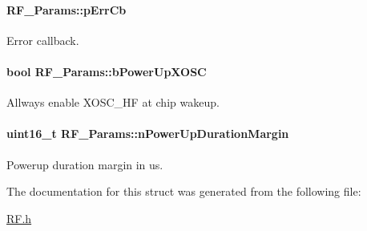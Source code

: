 \paragraph[{p\+Err\+Cb}]{ R\+F\+\_\+\+Params\+::p\+Err\+Cb}\label{struct_r_f___params_ab7be231b23fab2503b8c54b474fba74d}


Error callback. 

\paragraph[{b\+Power\+Up\+X\+O\+S\+C}]{\setlength{\rightskip}{0pt plus 5cm}bool R\+F\+\_\+\+Params\+::b\+Power\+Up\+X\+O\+S\+C}\label{struct_r_f___params_a66feaf5103de9d0b45085c7c44ea918b}


Allways enable X\+O\+S\+C\+\_\+\+H\+F at chip wakeup. 

\paragraph[{n\+Power\+Up\+Duration\+Margin}]{\setlength{\rightskip}{0pt plus 5cm}uint16\+\_\+t R\+F\+\_\+\+Params\+::n\+Power\+Up\+Duration\+Margin}\label{struct_r_f___params_a848ebeabce42f87f6a1d4f51f908dbe4}


Powerup duration margin in us. 



The documentation for this struct was generated from the following file\+:\begin{DoxyCompactItemize}
\item 
\hyperlink{_r_f_8h}{R\+F.\+h}\end{DoxyCompactItemize}
